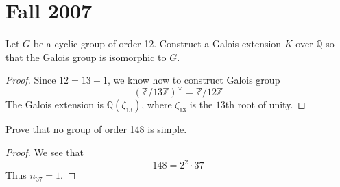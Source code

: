 \documentclass[openany]{book}
\newcommand{\Z}{\mathbb{Z}}
\newcommand{\Q}{\mathbb{Q}}
\begin{document}
\chapter{Fall 2007}



\begin{prob}
    Let \(G\) be a cyclic group of order 12. Construct a Galois extension \(K\) over \(\mathbb{Q}\) so that the Galois group is isomorphic to \(G\).
\end{prob}
\begin{proof}
    Since $12=13-1$, we know how to construct Galois group 
    \begin{equation*}
        \left(\Z/13\Z\right)^\times=\Z/12\Z
    \end{equation*}
    The Galois extension is $\Q(\zeta_{13})$, where $\zeta_{13}$ is the $13$th root of unity.
\end{proof}



\begin{prob}
    Prove that no group of order 148 is simple.
\end{prob}
\begin{proof}
    We see that 
    \begin{equation*}
        148=2^2\cdot 37
    \end{equation*}
    Thus $n_{37}=1$.
\end{proof}
\end{document}
